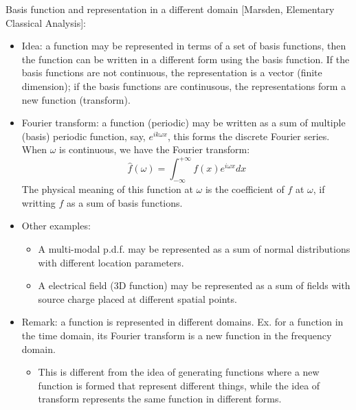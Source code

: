 \documentclass{report}
\begin{document}
Basis function and representation in a different domain [Marsden, Elementary Classical Analysis]: 
\begin{itemize}
\item Idea: a function may be represented in terms of a set of basis functions, then the function can be written in a different form using the basis function. If the basis functions are not continuous, the representation is a vector (finite dimension); if the basis functions are continusous, the representations form a new function (transform). 

\item Fourier transform: a function (periodic) may be written as a sum of multiple (basis) periodic function, say, $e^{i k \omega x}$, this forms the discrete Fourier series. When $\omega$ is continuous, we have the Fourier transform: 
\begin{equation}
\hat{f}(\omega) = \int_{-\infty}^{+\infty} f(x) e^{i \omega x} dx
\end{equation}
The physical meaning of this function at $\omega$ is the coefficient of $f$ at $\omega$, if writting $f$ as a sum of basis functions. 

\item Other examples: 
\begin{itemize}
	\item A multi-modal p.d.f. may be represented as a sum of normal distributions with different location parameters. 
	\item A electrical field (3D function) may be represented as a sum of fields with source charge placed at different spatial points. 
\end{itemize}

\item Remark: a function is represented in different domains. Ex. for a function in the time domain, its Fourier transform is a new function in the frequency domain.  
\begin{itemize}
	\item This is different from the idea of generating functions where a new function is formed that represent different things, while the idea of transform represents the same function in different forms. 
\end{itemize}
\end{itemize}
\end{document}
